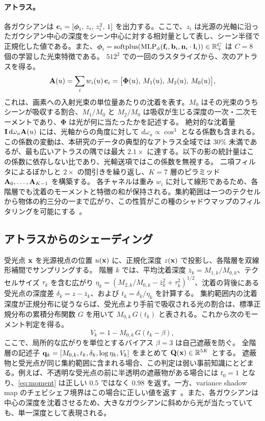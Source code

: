 \paragraph{アトラス。}
各ガウシアンは $\mathbf{c}_i=[\boldsymbol\phi_i,\,z_i,\,z_i^2,\,1]$ を出力する。ここで、$z_i$ は光源の光軸に沿ったガウシアン中心の深度をシーン中心に対する相対量として表し、シーン半径で正規化した値である。また、$\boldsymbol\phi_i=\operatorname{softplus}(\mathrm{MLP}_\phi(\mathbf{f}_i,\mathbf{b}_i,\mathbf{n}_i\cdot\mathbf{l}_i))\in\mathbb R_+^{C}$ は $C=8$ 個の学習した光束特徴である。
$512^2$ での一回のラスタライズから、次のアトラスを得る。
\begin{equation}
  \mathbf{A}(u)=\sum_i w_i(u)\,\mathbf{c}_i=\big[\boldsymbol\Phi(u),\,M_1(u),\,M_2(u),\,M_0(u)\big],
  \label{eq:atlas}
\end{equation}
これは、画素への入射光束の単位量あたりの沈着を表す。$M_0$ はその光束のうちシーンが吸収する割合、$M_1/M_0$ と $M_2/M_0$ は吸収が生じる深度の一次・二次モーメントであり、$\boldsymbol\Phi$ は光が何に当たったかを記述する。
絶対的な沈着量 $\mathbf{I}\,d\omega_u\mathbf{A}(u)$ には、光軸からの角度に対して $d\omega_u\propto\cos^3$ となる係数も含まれる。この係数の変動は、本研究のデータの典型的なアトラス全域では 30\% 未満であるが、最も広いアトラスの隅では最大 $2.1\times$ に達する。以下の影の統計量はこの係数に依存しない比であり、光輸送項ではこの係数を無視する。
二項フィルタによるぼかしと $2\times$ の間引きを繰り返し、$K=7$ 層のピラミッド $\mathbf{A}_0,\dots,\mathbf{A}_{K-1}$ を構築する。
各チャネルは重み $w_i$ に対して線形であるため、各階層でも沈着のモーメントと特徴の和が保持される。集約範囲は一つのテクセルから物体の約三分の一まで広がり、この性質がこの種のシャドウマップのフィルタリングを可能にする~\cite{donnelly2006variance,peters2015moment}。

\subsection{アトラスからのシェーディング}
\label{sec:shading}
受光点 $\mathbf{x}$ を光源視点の位置 $u(\mathbf{x})$ に、正規化深度 $z(\mathbf{x})$ で投影し、各階層を双線形補間でサンプリングする。
階層 $k$ では、平均沈着深度 $\bar z_k=M_{1,k}/M_{0,k}$、テクセルサイズ $\tau_k$ を含む広がり $\eta_k=(M_{2,k}/M_{0,k}-\bar z_k^2+\tau_k^2)^{1/2}$、沈着の背後にある受光点の深度差 $\delta_k=z-\bar z_k$、および $t_k=\delta_k/\eta_k$ を計算する。
集約範囲内の沈着深度が正規分布に従うならば、受光点より手前で吸収される光の割合は、標準正規分布の累積分布関数 $G$ を用いて $M_{0,k}\,G(t_k)$ と表される。これから次のモーメント判定を得る。
\begin{equation}
  V_k=1-M_{0,k}\,G(t_k-\beta),
  \label{eq:moment}
\end{equation}
ここで、局所的な広がりを単位とするバイアス $\beta=3$ は自己遮蔽を防ぐ。
全階層の記述子 $\mathbf{q}_k=[M_{0,k},t_k,\delta_k,\log\eta_k,V_k]$ をまとめて $\mathbf{Q}(\mathbf{x})\in\mathbb R^{5K}$ とする。
遮蔽物と受光点が同じ集約範囲に含まれる場合、この判定は弱い事前知識にとどまる。例えば、不透明な受光点の前に半透明の遮蔽物がある場合には $t_0=1$ となり、\cref{eq:moment} は正しい $0.5$ ではなく $0.98$ を返す。一方、variance shadow map のチェビシェフ境界はこの場合に正しい値を返す~\cite{donnelly2006variance}。また、各ガウシアンは中心の深度を沈着させるため、大きなガウシアンに斜めから光が当たっていても、単一深度として表現される。

